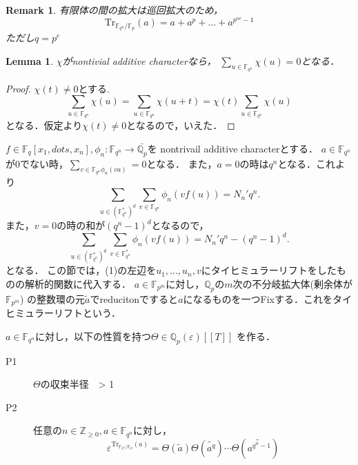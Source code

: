 \documentclass{ujarticle}
\newtheorem{lem}[thm]{Lemma}
\newtheorem*{rem}{Remark}
\begin{document}
\begin{rem}
 有限体の間の拡大は巡回拡大のため，
 \begin{equation*}
   \mathrm{Tr}_{\mathbb{F}_{q^n}/\mathbb{F}_p}(a)=
   a + a^p + \dots + a^{p^{ne}-1}
 \end{equation*}
 ただし$q=p^e$
\end{rem}

\begin{lem}
 $\chi$がnontivial additive characterなら， $\sum_{u \in
 \mathbb{F}_{q^n}}\chi(u)=0$となる．
\end{lem}

\begin{proof}
 $\chi(t) \neq 0$とする.
 \begin{equation*}
   \sum_{u \in \mathbb{F}_{q^n}}\chi(u)=
   \sum_{u \in \mathbb{F}_{q^n}}\chi(u+t)=
   \chi(t)\sum_{u \in \mathbb{F}_{q^n}}\chi(u)
 \end{equation*}
 となる．仮定より$\chi(t) \neq 0$となるので，いえた．
\end{proof}

$f \in \mathbb{F}_q[x_1,dots,x_n], \phi_n: \mathbb{F}_{q^n} \to \bar{\mathbb{Q}_p}$を
nontrivail additive characterとする．
$a \in \mathbb{F}_{q^n}$が0でない時，$\sum_{v \in \mathbb{F}_{q^n}\phi_n(va)}=0$となる．
また，$a=0$の時は$q^n$となる．これより
\begin{equation*}
 \sum_{u \in (\mathbb{F}_{q^n}^*)^d} \sum_{v \in \mathbb{F}_{q^n}} \phi_n(vf(u))=
 N_n'q^n.
\end{equation*}
また，$v=0$の時の和が$(q^n-1)^d$となるので，
\begin{equation}
  \sum_{u \in (\mathbb{F}_{q^n}^*)^d} \sum_{v \in \mathbb{F}_{q^n}^*} \phi_n(vf(u))=
  N_n'q^n - (q^n-1)^d.
\end{equation}
となる．
この節では，(1)の左辺を$u_1,\dots,u_n,v$にタイヒミュラーリフトをしたものの解析的関数に代入する．
$a \in \mathbb{F}_{p^m}$に対し，$\mathbb{Q}_p$の$m$次の不分岐拡大体(剰余体が$\mathbb{F}_{p^m}$)
の整数環の元$\tilde{a}$でreducitonですると$a$になるものを一つFixする．これをタイヒミュラーリフトという．

$a \in \mathbb{F}_{q^n}$に対し，以下の性質を持つ$\Theta \in \mathbb{Q}_p(\varepsilon)[[T]]$
を作る．

\begin{description}
  \item[P1] $\Theta$の収束半径　> 1
  \item[P2] 任意の$n \in \mathbb{Z}_{\ge 0}, a \in \mathbb{F}_{q^n}$に対し，
  \begin{equation}
    \varepsilon^{\mathrm{Tr}_{\mathbb{F}_{q^n}/\mathbb{F}_p}(a)}=
    \Theta(\tilde{a})\Theta(\tilde{a^q})\cdots\Theta(\tilde{a^{q^n-1}})
  \end{equation}
\end{description}
\end{document}
